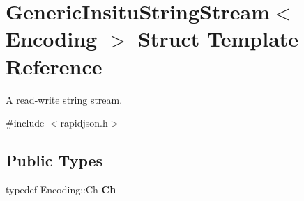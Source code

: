 \hypertarget{struct_generic_insitu_string_stream}{}\section{Generic\+Insitu\+String\+Stream$<$ Encoding $>$ Struct Template Reference}
\label{struct_generic_insitu_string_stream}


A read-\/write string stream.  




{\ttfamily \#include $<$rapidjson.\+h$>$}

\subsection*{Public Types}
\begin{DoxyCompactItemize}
\item 
typedef Encoding\+::\+Ch {\bfseries Ch}\hypertarget{struct_generic_insitu_string_stream_a277308a58f551f11d0d9a20823702b5a}{}\label{struct_generic_insitu_string_stream_a277308a58f551f11d0d9a20823702b5a}

\end{DoxyCompactItemize}
